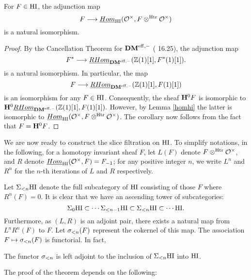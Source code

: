 \begin{cor}
For $F \in \mathrm{HI}$, the adjunction map 
\[
F \longrightarrow \underline{Hom}_{\mathrm{HI}}(\mathcal{O}^{\times}, F \otimes^{\mathrm{Htr}} \mathcal{O}^{\times})
\] 
is a natural isomorphism.
\end{cor}
\begin{proof}
By the Cancellation Theorem for $\mathbf{DM}^{\mathrm{eff},-}$ (\cite{MVW} 16.25), the 
adjunction map 
\[
F^* \longrightarrow \underline{RHom}_{\mathbf{DM}^{\mathrm{eff},-}}(\mathbb{Z}(1)[1], F^*(1)[1]).
\] 
is a natural isomorphism. In particular, the map 
\[
F \longrightarrow \underline{RHom}_{\mathbf{DM}^{\mathrm{eff},-}}(\mathbb{Z}(1)[1], F(1)[1])
\]
is an isomorphism for any $F \in \mathrm{HI}$. Consequently, the sheaf 
$\mathbf{H}^0 F$ is isomorphic to $\mathbf{H}^0\underline{RHom}_{\mathbf{DM}^{\mathrm{eff},-}}(\mathbb{Z}(1)[1],\allowbreak 
F(1)[1]).$ However, by Lemma \ref{homhi} the latter is isomorphic 
to $\underline{Hom}_{\mathrm{HI}}(\mathcal{O}^{\times},\allowbreak F \otimes^{\mathrm{Htr}}\mathcal{O}^{\times})$. The corollary now 
follows from the fact that $F = \mathbf{H}^0 F$.
\end{proof}

We are now ready to construct the slice filtration on $\mathrm{HI}$. 
To simplify notations, in the following, for a homotopy invariant
sheaf $F$, let $L(F)$ denote $F \otimes^{\mathrm{Htr}} \mathcal{O}^{\times}$, and $R$ denote 
$\underline{Hom}_{\mathrm{HI}}(\mathcal{O}^{\times}, F) = F_{-1}$; for any positive integer $n$, we 
write $L^n$ and $R^n$ for the $n$-th iterations of $L$ and $R$ 
respectively.

Let $\Sigma_{< n} \mathrm{HI}$ denote the full subcategory of $\mathrm{HI}$ 
consisting of those $F$ where $R^n(F) = 0$. It is clear that we 
have an ascending tower of subcategories:
\[
\Sigma_{0} \mathrm{HI} \subset \cdots \Sigma_{< n - 1} \mathrm{HI} \subset 
\Sigma_{< n} \mathrm{HI} \subset \cdots \mathrm{HI}.
\]
Furthermore, as $(L, R)$ is an adjoint pair, there exists a 
natural map from $L^nR^n(F)$ to $F$. Let $\sigma_{< n}(F)$ represent 
the cokernel of this map. The association $F \mapsto 
\sigma_{< n}(F)$ is functorial. In fact,

\begin{thm}\label{slicethm}
The functor $\sigma_{< n}$ is left adjoint to the inclusion 
of $\Sigma_{< n} \mathrm{HI}$ into $\mathrm{HI}$.
\end{thm}

The proof of the theorem depends on the following:

